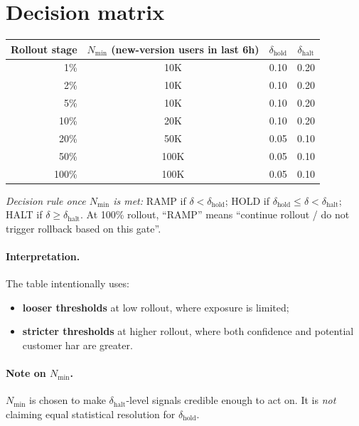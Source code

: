 \documentclass{article}
\newcommand{\pp}{\text{pp}}
\newcommand{\dhalt}{\delta_{\text{halt}}}
\newcommand{\dhold}{\delta_{\text{hold}}}
\begin{document}
\section{Decision matrix}

\begin{table}[ht]
    \centering
    \small
    \renewcommand{\arraystretch}{1.2}
    \begin{tabular}{@{}r c c c@{}}
        \toprule
        \textbf{Rollout stage} &
        \textbf{\(N_{\min}\) (new-version users in last 6h)} &
        \textbf{\(\delta_{\text{hold}}\)} &
        \textbf{\(\delta_{\text{halt}}\)} \\
        \midrule
        1\%   & 10K  & 0.10\pp & 0.20\pp \\
        2\%   & 10K  & 0.10\pp & 0.20\pp \\
        5\%   & 10K  & 0.10\pp & 0.20\pp \\
        10\%  & 20K  & 0.10\pp & 0.20\pp \\
        20\%  & 50K  & 0.05\pp & 0.10\pp \\
        50\%  & 100K & 0.05\pp & 0.10\pp \\
        100\% & 100K & 0.05\pp & 0.10\pp \\
        \bottomrule
    \end{tabular}

    \vspace{0.3em}
    \parbox{0.92\linewidth}{\footnotesize
    \textit{Decision rule once \(N_{\min}\) is met:}
    RAMP if \(\delta < \delta_{\text{hold}}\);
    HOLD if \(\delta_{\text{hold}} \le \delta < \delta_{\text{halt}}\);
    HALT if \(\delta \ge \delta_{\text{halt}}\).
    At 100\% rollout, ``RAMP'' means ``continue rollout / do not trigger rollback based on this gate''.
    }
\end{table}

\paragraph{Interpretation.}
The table intentionally uses:
\begin{itemize}[leftmargin=1.4em]
    \item \textbf{looser thresholds} at low rollout, where exposure is limited;
    \item \textbf{stricter thresholds} at higher rollout, where both confidence and potential customer har are greater. 
\end{itemize}

\paragraph{Note on $N_{\min}$.}
$N_{\min}$ is chosen to make $\dhalt$-level signals credible enough to act on.
It is \emph{not} claiming equal statistical resolution for $\dhold$.
\end{document}
